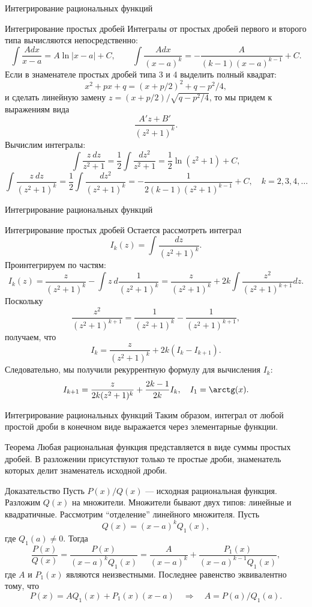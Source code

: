\documentclass[8pt]{beamer}
\begin{document}
\begin{frame}[t]{Интегрирование рациональных функций}
\begin{block}{Интегрирование простых дробей}
Интегралы от простых дробей первого и второго типа вычисляются непосредственно:
$$\int \frac{Adx}{x-a} = A\ln|x-a|+C,\qquad \int \frac{Adx}{(x-a)^k} = -\frac{A}{(k-1)(x-a)^{k-1}}+C.$$
Если в знаменателе простых дробей типа 3 и 4 выделить полный квадрат:
$$x^2+px+q = (x+p/2)^2+q-p^2/4,$$
и сделать линейную замену $z=(x+p/2)/\sqrt{q-p^2/4}$, то мы придем к выражениям вида
$$\frac{A'z+B'}{(z^2+1)^k}.$$
Вычислим интегралы:
$$\int \frac{z\ dz}{z^2+1} = \frac{1}{2}\int \frac{dz^2}{z^2+1} =\frac{1}{2} \ln(z^2+1)+C,$$
$$\int \frac{z\ dz}{(z^2+1)^k} = \frac{1}{2}\int \frac{dz^2}{(z^2+1)^k} = -\frac{1}{2(k-1)(z^2+1)^{k-1}}+C,\quad k=2,3,4,\ldots$$
\end{block}

\end{frame}

\begin{frame}[t]{Интегрирование рациональных функций}
\begin{block}{Интегрирование простых дробей}
Остается рассмотреть интеграл
$$I_k(z) = \int \frac{dz}{(z^2+1)^k}.$$
Проинтегрируем по частям:
$$I_k(z) = \frac{z}{(z^2+1)^k} - \int z\ d\frac{1}{(z^2+1)^k} =\frac{z}{(z^2+1)^k}+2k\int \frac{z^2}{(z^2+1)^{k+1}}dz .$$
Поскольку
$$\frac{z^2}{(z^2+1)^{k+1}} = \frac{1}{(z^2+1)^{k}} -  \frac{1}{(z^2+1)^{k+1}},$$
получаем, что
$$I_k = \frac{z}{(z^2+1)^k}+2k(I_k-I_{k+1}).$$
Следовательно, мы получили рекуррентную формулу для вычисления $I_{k}$:
$$I_{k+1} = \frac{z}{2k (z^2+1)^k}+\frac{2k-1}{2k} I_k,\quad I_1 = \arctg(x).$$
\end{block}
\end{frame}

\begin{frame}{Интегрирование рациональных функций}
Таким образом, интеграл от любой простой дроби в конечном виде выражается через элементарные функции. 

\begin{block}{Теорема}
Любая рациональная функция представляется в виде суммы простых дробей. В разложении присутствуют только те простые дроби, знаменатель которых делит знаменатель исходной дроби.
\end{block}

\begin{block}{Доказательство}
Пусть $P(x)/Q(x)$ --- исходная рациональная функция. Разложим $Q(x)$ на множители. Множители бывают двух типов: линейные и квадратичные. Рассмотрим ``отделение'' линейного множителя. Пусть 
$$Q(x) = (x-a)^k Q_1(x),$$
где $Q_1(a)\ne 0$. Тогда
$$\frac{P(x)}{Q(x)} = \frac{P(x)}{(x-a)^k Q_1(x)} = \frac{A}{(x-a)^k}+\frac{P_1(x)}{(x-a)^{k-1} Q_1(x)},$$
где $A$ и $P_1(x)$ являются неизвестными. Последнее равенство эквивалентно тому, что
$$P(x) = A Q_1(x)+P_1(x) (x-a) \quad \Rightarrow \quad A=P(a)/Q_1(a).$$
\end{block}
\end{frame}
\end{document}
